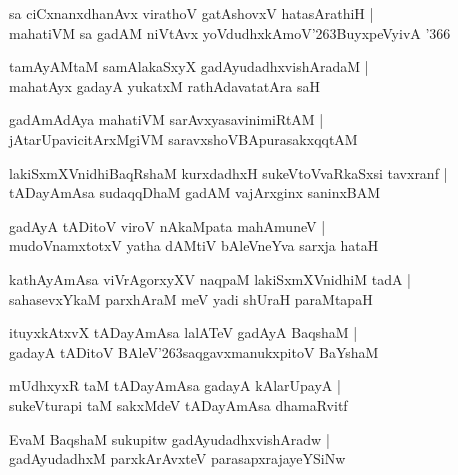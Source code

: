 \documentclass[twoside,12pt,openright]{book}
\def\S{\char'263}
\newcounter{shloka}[chapter]
\begin{document}
\begin{shloka}%
sa ciCxnanxdhanAvx virathoV gatAshovxV hatasArathiH |\\
mahatiVM sa gadAM niVtAvx yoVdudhxkAmoV\S BuyxpeVyivA \char'366
\end{shloka}

\begin{shloka}%
tamAyAMtaM samAlakaSxyX gadAyudadhxvishAradaM |\\
mahatAyx gadayA yukatxM rathAdavatatAra saH 
\end{shloka}

\begin{shloka}%
gadAmAdAya mahatiVM sarAvxyasavinimiRtAM |\\
jAtarUpavicitArxMgiVM saravxshoVBApurasakxqqtAM 
\end{shloka}

\begin{shloka}%
lakiSxmXVnidhiBaqRshaM kurxdadhxH sukeVtoVvaRkaSxsi tavxranf |\\
tADayAmAsa sudaqqDhaM gadAM vajArxginx saninxBAM 
\end{shloka}

\begin{shloka}%
gadAyA tADitoV viroV nAkaMpata mahAmuneV |\\
mudoVnamxtotxV yatha dAMtiV bAleVneYva sarxja hataH 
\end{shloka}

\begin{shloka}%
kathAyAmAsa viVrAgorxyXV naqpaM lakiSxmXVnidhiM tadA |\\
sahasevxYkaM parxhAraM meV yadi shUraH paraMtapaH 
\end{shloka}

\begin{shloka}%
ituyxkAtxvX tADayAmAsa lalATeV gadAyA BaqshaM |\\
gadayA tADitoV BAleV\S saqgavxmanukxpitoV BaYshaM 
\end{shloka}

\begin{shloka}%
mUdhxyxR taM tADayAmAsa gadayA kAlarUpayA |\\
sukeVturapi taM sakxMdeV tADayAmAsa dhamaRvitf 
\end{shloka}

\begin{shloka}%
EvaM BaqshaM sukupitw gadAyudadhxvishAradw |\\
gadAyudadhxM parxkArAvxteV parasapxrajayeYSiNw
\end{shloka}
\end{document}
